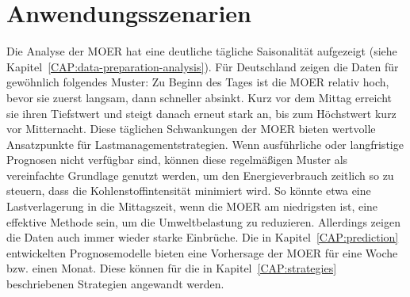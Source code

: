 \section{Anwendungsszenarien}\label{CAP:scenarios}
Die Analyse der \ac{MOER} hat eine deutliche tägliche Saisonalität aufgezeigt (siehe Kapitel~\ref{CAP:data-preparation-analysis}).
Für Deutschland zeigen die Daten für gewöhnlich folgendes Muster:
Zu Beginn des Tages ist die \ac{MOER} relativ hoch, bevor sie zuerst langsam, dann schneller absinkt.
Kurz vor dem Mittag erreicht sie ihren Tiefstwert und steigt danach erneut stark an, bis zum Höchstwert kurz vor Mitternacht.
Diese täglichen Schwankungen der \ac{MOER} bieten wertvolle Ansatzpunkte für Lastmanagementstrategien.
Wenn ausführliche oder langfristige Prognosen nicht verfügbar sind, können diese regelmäßigen Muster als vereinfachte Grundlage genutzt werden, um den Energieverbrauch zeitlich so zu steuern, dass die Kohlenstoffintensität minimiert wird.
So könnte etwa eine Lastverlagerung in die Mittagszeit, wenn die \ac{MOER} am niedrigsten ist, eine effektive Methode sein, um die Umweltbelastung zu reduzieren.
Allerdings zeigen die Daten auch immer wieder starke Einbrüche.
Die in Kapitel~\ref{CAP:prediction} entwickelten Prognosemodelle bieten eine Vorhersage der \ac{MOER} für eine Woche bzw. einen Monat.
Diese können für die in Kapitel~\ref{CAP:strategies} beschriebenen Strategien angewandt werden.

